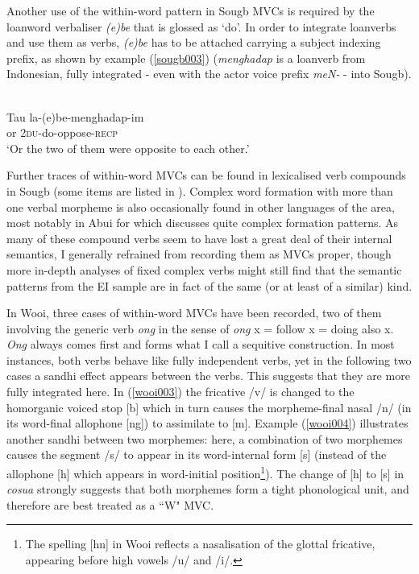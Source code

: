 Another use of the within-word pattern in Sougb MVCs is required by the loanword verbaliser \textit{(e)be} that is glossed as `do'. In order to integrate loanverbs and use them as verbs, \textit{(e)be} has to be attached carrying a subject indexing prefix, as shown by example (\ref{sougb003}) (\textit{menghadap} is a loanverb from Indonesian, fully integrated - even with the actor voice prefix \textit{meN-} - into Sougb).

\ea \label{sougb003}
\\
\gll Tau la-(e)be-menghadap-im \\
or 2\textsc{du}-do-oppose-\textsc{recp} \\
\glft `Or the two of them were opposite to each other.'\\
\z

Further traces of within-word MVCs can be found in lexicalised verb compounds in Sougb (some items are listed in \citealt[216]{reesink2002grammar}). Complex word formation with more than one verbal morpheme is also occasionally found in other languages of the area, most notably in Abui for which \citet{kratochvil2007grammar} discusses quite complex formation patterns. As many of these compound verbs seem to have lost a great deal of their internal semantics, I generally refrained from recording them as MVCs proper, though more in-depth analyses of fixed complex verbs might still find that the semantic patterns from the EI sample are in fact of the same (or at least of a similar) kind.

In Wooi, three cases of within-word MVCs have been recorded, two of them involving the generic verb \textit{ong} in the sense of \textit{ong} x = follow x = doing also x. \textit{Ong} always comes first and forms what I call a sequitive construction. In most instances, both verbs behave like fully independent verbs, yet in the following two cases a sandhi effect appears between the verbs. This suggests that they are more fully integrated here. In (\ref{wooi003}) the fricative /v/ is changed to the homorganic voiced stop [b] which in turn causes the morpheme-final nasal /n/ (in its word-final allophone [ng]) to assimilate to [m]. Example (\ref{wooi004}) illustrates another sandhi between two morphemes: here, a combination of two morphemes causes the segment /s/ to appear in its word-internal form [s] (instead of the allophone [h] which appears in word-initial position\footnote{The spelling [hn] in Wooi reflects a nasalisation of the glottal fricative, appearing before high vowels /u/ and /i/.}). The change of [h] to [s] in \textit{cosua} strongly suggests that both morphemes form a tight phonological unit, and therefore are best treated as a ``W" MVC.

